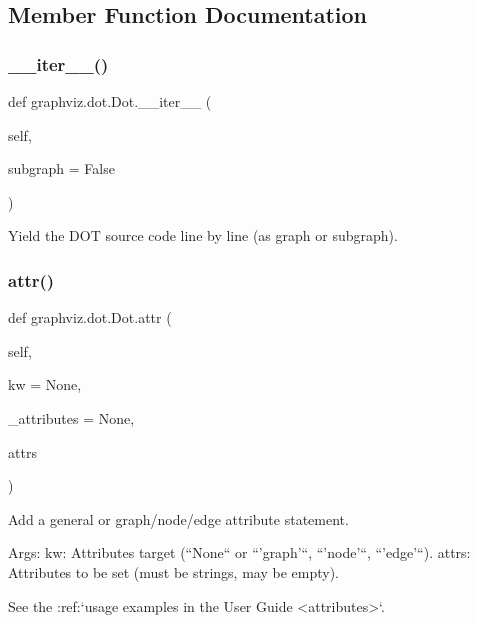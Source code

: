 \subsection{Member Function Documentation}
\mbox{\label{classgraphviz_1_1dot_1_1Dot_afe958e1e39f769a9bb6f0af514c2affc}} 
\subsubsection{\texorpdfstring{\+\_\+\+\_\+iter\+\_\+\+\_\+()}{\_\_iter\_\_()}}
{\footnotesize\ttfamily def graphviz.\+dot.\+Dot.\+\_\+\+\_\+iter\+\_\+\+\_\+ (\begin{DoxyParamCaption}\item[{}]{self,  }\item[{}]{subgraph = {\ttfamily False} }\end{DoxyParamCaption})}

\begin{DoxyVerb}Yield the DOT source code line by line (as graph or subgraph).\end{DoxyVerb}
 \mbox{\label{classgraphviz_1_1dot_1_1Dot_a095c4f4959996ac084b5a0f736f66aa8}} 
\subsubsection{\texorpdfstring{attr()}{attr()}}
{\footnotesize\ttfamily def graphviz.\+dot.\+Dot.\+attr (\begin{DoxyParamCaption}\item[{}]{self,  }\item[{}]{kw = {\ttfamily None},  }\item[{}]{\+\_\+attributes = {\ttfamily None},  }\item[{}]{attrs }\end{DoxyParamCaption})}

\begin{DoxyVerb}Add a general or graph/node/edge attribute statement.

Args:
    kw: Attributes target (``None`` or ``'graph'``, ``'node'``, ``'edge'``).
    attrs: Attributes to be set (must be strings, may be empty).

See the :ref:`usage examples in the User Guide <attributes>`.
\end{DoxyVerb}
 \mbox{\label{classgraphviz_1_1dot_1_1Dot_a9e663d6ac500c91024eb8c6a5d94a0c0}} 

